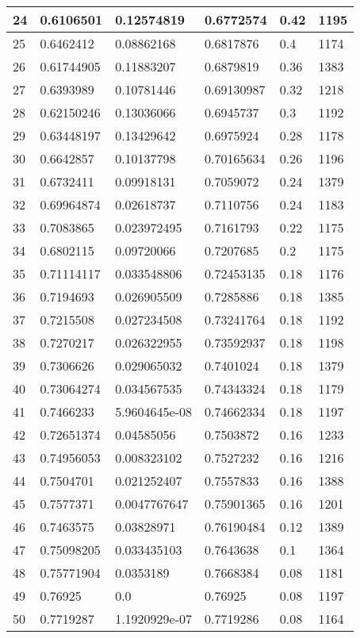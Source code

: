 \begin{longtable}{|l|l|l|l|l|l|}
24 & 0.6106501 & 0.12574819 & 0.6772574 & 0.42 & 1195 \\ \hline 
25 & 0.6462412 & 0.08862168 & 0.6817876 & 0.4 & 1174 \\ \hline 
26 & 0.61744905 & 0.11883207 & 0.6879819 & 0.36 & 1383 \\ \hline 
27 & 0.6393989 & 0.10781446 & 0.69130987 & 0.32 & 1218 \\ \hline 
28 & 0.62150246 & 0.13036066 & 0.6945737 & 0.3 & 1192 \\ \hline 
29 & 0.63448197 & 0.13429642 & 0.6975924 & 0.28 & 1178 \\ \hline 
30 & 0.6642857 & 0.10137798 & 0.70165634 & 0.26 & 1196 \\ \hline 
31 & 0.6732411 & 0.09918131 & 0.7059072 & 0.24 & 1379 \\ \hline 
32 & 0.69964874 & 0.02618737 & 0.7110756 & 0.24 & 1183 \\ \hline 
33 & 0.7083865 & 0.023972495 & 0.7161793 & 0.22 & 1175 \\ \hline 
34 & 0.6802115 & 0.09720066 & 0.7207685 & 0.2 & 1175 \\ \hline 
35 & 0.71114117 & 0.033548806 & 0.72453135 & 0.18 & 1176 \\ \hline 
36 & 0.7194693 & 0.026905509 & 0.7285886 & 0.18 & 1385 \\ \hline 
37 & 0.7215508 & 0.027234508 & 0.73241764 & 0.18 & 1192 \\ \hline 
38 & 0.7270217 & 0.026322955 & 0.73592937 & 0.18 & 1198 \\ \hline 
39 & 0.7306626 & 0.029065032 & 0.7401024 & 0.18 & 1379 \\ \hline 
40 & 0.73064274 & 0.034567535 & 0.74343324 & 0.18 & 1179 \\ \hline 
41 & 0.7466233 & 5.9604645e-08 & 0.74662334 & 0.18 & 1197 \\ \hline 
42 & 0.72651374 & 0.04585056 & 0.7503872 & 0.16 & 1233 \\ \hline 
43 & 0.74956053 & 0.008323102 & 0.7527232 & 0.16 & 1216 \\ \hline 
44 & 0.7504701 & 0.021252407 & 0.7557833 & 0.16 & 1388 \\ \hline 
45 & 0.7577371 & 0.0047767647 & 0.75901365 & 0.16 & 1201 \\ \hline 
46 & 0.7463575 & 0.03828971 & 0.76190484 & 0.12 & 1389 \\ \hline 
47 & 0.75098205 & 0.033435103 & 0.7643638 & 0.1 & 1364 \\ \hline 
48 & 0.75771904 & 0.0353189 & 0.7668384 & 0.08 & 1181 \\ \hline 
49 & 0.76925 & 0.0 & 0.76925 & 0.08 & 1197 \\ \hline 
50 & 0.7719287 & 1.1920929e-07 & 0.7719286 & 0.08 & 1164 \\ \hline 
\end{longtable}